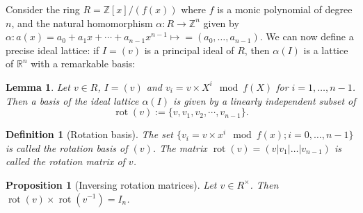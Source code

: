 \documentclass[11pt]{article}
\theoremstyle{plain}
\newtheorem{LEM}[THE]{Lemma}
\newtheorem{PROP}[THE]{Proposition}
\newtheorem{DEF}{Definition}[section]
\theoremstyle{definition}
\newtheorem{EXA}{\bf Example}[section]
\theoremstyle{remark}
\newtheorem*{REM}{Remark}
\newcommand{\RR}{\mathbb{R}}      %
\newcommand{\ZZ}{\mathbb{Z}}      %
\newcommand{\rot}{\operatorname{rot}}
\begin{document}
\label{subsec:polynomialprincipalideallattices}
Consider the ring $R=\ZZ[x]/(f(x))$ where $f$ is a monic polynomial of degree $n$, and the natural homomorphism $\alpha: R\to \ZZ^n$ given by $\alpha: a(x)= a_0+a_1x+\cdots+a_{n-1}x^{n-1}\mapsto=(a_0,\dots,a_{n-1}).$
We can now define a precise ideal lattice: if $I=(v)$ is a principal ideal of $R$, then $\alpha(I)$ is a lattice of $\RR^n$ with a remarkable basis:
\begin{LEM}\label{lem:rot}
Let $v\in R$, $I=(v)$ and $v_i= v\times X^i\mod f(X)$ for $i=1,\dots,n-1$. Then a basis of the ideal lattice $\alpha(I)$ is given by a linearly independent subset of  
$$\operatorname{rot}(v):=\{v,v_1,v_2,\cdots,v_{n-1}\}.$$
\end{LEM}
\begin{DEF}[Rotation basis]
The set $\{v_i=v\times x^i\!\mod f(x); i=0,\dots,n-1\}$ is called the {\it rotation basis of $(v)$}. The matrix $\rot(v)=(v|v_1|\dots|v_{n-1})$ is called the {\it rotation matrix} of $v$.
\end{DEF}
\begin{PROP}[Inversing rotation matrices]
Let $v\in R^\times$. Then $\rot(v)\times \rot(v^{-1})=I_n$.
\end{PROP}
\end{document}

